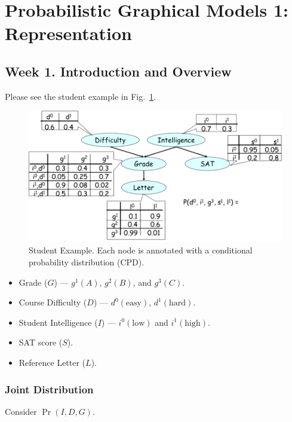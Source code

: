 \documentclass[12pt]{article}
\begin{document}
\section{Probabilistic Graphical Models 1: Representation}

\subsection{Week 1. Introduction and Overview}

Please see the student example in Fig.~\ref{fig:student_example}.

\begin{figure}[H]
\centering
\includegraphics[width=6.5in]{graphics/example_student.png}
\caption{Student Example. Each node is annotated with a conditional probability distribution (CPD).}
\label{fig:student_example}
\end{figure}


\begin{itemize}
    \item Grade ($G$) --- $g^1(A)$, $g^2(B)$, and $g^3(C)$.
    \item Course Difficulty ($D$) --- $d^0(\text{easy})$, $d^1(\text{hard})$.
    \item Student Intelligence ($I$) --- $i^0(\text{low})$ and $i^1(\text{high})$.
    \item SAT score ($S$).
    \item Reference Letter ($L$).
\end{itemize}
 



\subsubsection{Joint Distribution}
Consider $\Pr(I, D, G)$.
\end{document}
